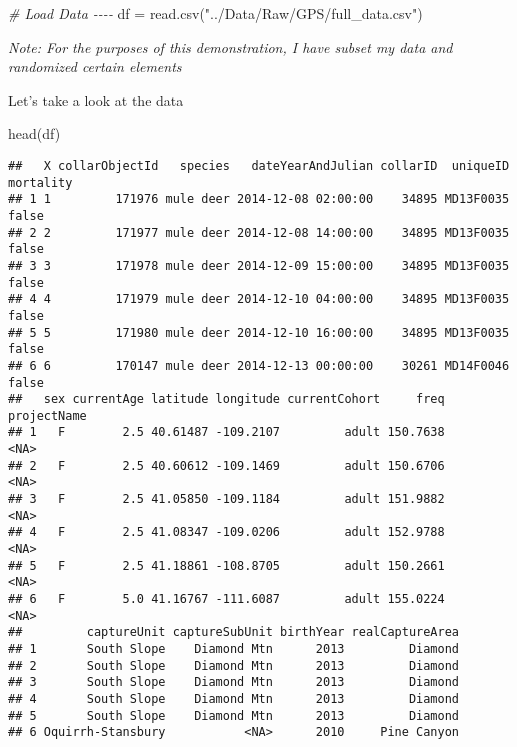 \documentclass[
]{book}
\newenvironment{Shaded}{\begin{snugshade}}{\end{snugshade}}
\newcommand{\CommentTok}[1]{\textcolor[rgb]{0.56,0.35,0.01}{\textit{#1}}}
\newcommand{\FunctionTok}[1]{\textcolor[rgb]{0.00,0.00,0.00}{#1}}
\newcommand{\NormalTok}[1]{#1}
\newcommand{\OtherTok}[1]{\textcolor[rgb]{0.56,0.35,0.01}{#1}}
\newcommand{\StringTok}[1]{\textcolor[rgb]{0.31,0.60,0.02}{#1}}
\begin{document}
\begin{Shaded}
\begin{Highlighting}[]
\CommentTok{\# Load Data {-}{-}{-}{-}}
\NormalTok{df }\OtherTok{=} \FunctionTok{read.csv}\NormalTok{(}\StringTok{"../Data/Raw/GPS/full\_data.csv"}\NormalTok{)}
\end{Highlighting}
\end{Shaded}

\emph{Note: For the purposes of this demonstration, I have subset my data and randomized certain elements}

Let's take a look at the data

\begin{Shaded}
\begin{Highlighting}[]
\FunctionTok{head}\NormalTok{(df)}
\end{Highlighting}
\end{Shaded}

\begin{verbatim}
##   X collarObjectId   species   dateYearAndJulian collarID  uniqueID mortality
## 1 1         171976 mule deer 2014-12-08 02:00:00    34895 MD13F0035     false
## 2 2         171977 mule deer 2014-12-08 14:00:00    34895 MD13F0035     false
## 3 3         171978 mule deer 2014-12-09 15:00:00    34895 MD13F0035     false
## 4 4         171979 mule deer 2014-12-10 04:00:00    34895 MD13F0035     false
## 5 5         171980 mule deer 2014-12-10 16:00:00    34895 MD13F0035     false
## 6 6         170147 mule deer 2014-12-13 00:00:00    30261 MD14F0046     false
##   sex currentAge latitude longitude currentCohort     freq projectName
## 1   F        2.5 40.61487 -109.2107         adult 150.7638        <NA>
## 2   F        2.5 40.60612 -109.1469         adult 150.6706        <NA>
## 3   F        2.5 41.05850 -109.1184         adult 151.9882        <NA>
## 4   F        2.5 41.08347 -109.0206         adult 152.9788        <NA>
## 5   F        2.5 41.18861 -108.8705         adult 150.2661        <NA>
## 6   F        5.0 41.16767 -111.6087         adult 155.0224        <NA>
##         captureUnit captureSubUnit birthYear realCaptureArea
## 1       South Slope    Diamond Mtn      2013         Diamond
## 2       South Slope    Diamond Mtn      2013         Diamond
## 3       South Slope    Diamond Mtn      2013         Diamond
## 4       South Slope    Diamond Mtn      2013         Diamond
## 5       South Slope    Diamond Mtn      2013         Diamond
## 6 Oquirrh-Stansbury           <NA>      2010     Pine Canyon
\end{verbatim}
\end{document}
